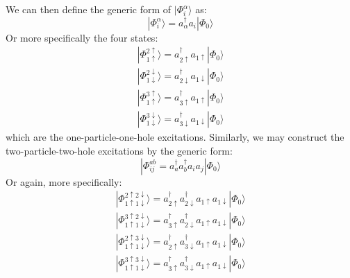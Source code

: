 \documentclass{article}
\begin{document}
\newline
We can then define the generic form of $| \Phi_i^\alpha \rangle$ as:
\begin{equation} \label{gen}
    | \Phi_i^\alpha \rangle = a_\alpha^\dagger a_i | \Phi_0 \rangle
\end{equation}
Or more specifically the four states:
\begin{gather*}
    | \Phi_{1 \uparrow}^{2\uparrow} \rangle = a_{2 \uparrow}^\dagger a_{1\uparrow} | \Phi_0 \rangle \\
    | \Phi_{1 \downarrow}^{2\downarrow} \rangle = a_{2 \downarrow}^\dagger a_{1\downarrow} | \Phi_0 \rangle \\
    | \Phi_{1 \uparrow}^{3\uparrow} \rangle = a_{3 \uparrow}^\dagger a_{1\uparrow} | \Phi_0 \rangle \\
    | \Phi_{1 \downarrow}^{3\downarrow} \rangle = a_{3 \downarrow}^\dagger a_{1\downarrow} | \Phi_0 \rangle
\end{gather*}
which are the one-particle-one-hole excitations. Similarly, we may construct the two-particle-two-hole excitations by the generic form:
\begin{equation}
    | \Phi _{ij}^{a b} = a_a^\dagger a_b^\dagger a_i a_j |\Phi_0 \rangle
\end{equation}
Or again, more specifically:
\begin{gather*}
    | \Phi_{1\uparrow 1 \downarrow}^{2 \uparrow 2 \downarrow} \rangle = a_{2 \uparrow}^\dagger a_{2\downarrow}^\dagger a_{1 \uparrow} a_{1\downarrow} | \Phi_0 \rangle \\
    | \Phi_{1\uparrow 1 \downarrow}^{3 \uparrow 2 \downarrow} \rangle = a_{3 \uparrow}^\dagger a_{2\downarrow}^\dagger a_{1 \uparrow} a_{1\downarrow} | \Phi_0 \rangle \\
    | \Phi_{1\uparrow 1 \downarrow}^{2 \uparrow 3 \downarrow} \rangle = a_{2 \uparrow}^\dagger a_{3\downarrow}^\dagger a_{1 \uparrow} a_{1\downarrow} | \Phi_0 \rangle \\
    | \Phi_{1\uparrow 1 \downarrow}^{3 \uparrow 3 \downarrow} \rangle = a_{3 \uparrow}^\dagger a_{3\downarrow}^\dagger a_{1 \uparrow} a_{1\downarrow} | \Phi_0 \rangle
\end{gather*}
\end{document}
